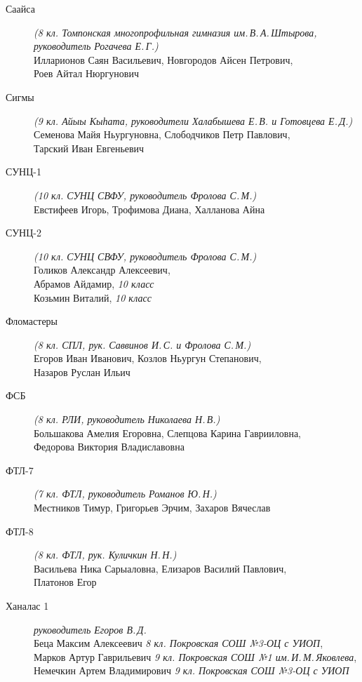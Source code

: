 \begin{description}
\item[Саайса] \textit{(8 кл. Томпонская многопрофильная гимназия им.\,В.\,А.\,Штырова, \\
руководитель Рогачева Е.\,Г.)} \\
Илларионов Саян Васильевич, Новгородов Айсен Петрович, \\
Роев Айтал Нюргунович

\item[Сигмы] \textit{(9 кл. Айыы Кыһата, руководители Халабышева Е.\,В. и Готовцева Е.\,Д.)} \\
Семенова Майя Ньургуновна, Слободчиков Петр Павлович, \\
Тарский Иван Евгеньевич

\item[СУНЦ-1] \textit{(10 кл. СУНЦ СВФУ, руководитель Фролова С.\,М.)} \\
Евстифеев Игорь, Трофимова Диана, Халланова Айна

\item[СУНЦ-2] \textit{(10 кл. СУНЦ СВФУ, руководитель Фролова С.\,М.)} \\
Голиков Александр Алексеевич, \\
Абрамов Айдамир, \textit{10 класс} \\
Козьмин Виталий, \textit{10 класс}

\item[Фломастеры] \textit{(8 кл. СПЛ, рук. Саввинов И.\,С. и Фролова С.\,М.)} \\
Егоров Иван Иванович, Козлов Ньургун Степанович, \\
Назаров Руслан Ильич

\item[ФСБ] \textit{(8 кл. РЛИ, руководитель Николаева Н.\,В.)} \\
Большакова Амелия Егоровна, Слепцова Карина Гаврииловна, \\
Федорова Виктория Владиславовна

\item[ФТЛ-7] \textit{(7 кл. ФТЛ, руководитель Романов Ю.\,Н.)} \\
Местников Тимур, Григорьев Эрчим, Захаров Вячеслав

\item[ФТЛ-8] \textit{(8 кл. ФТЛ, рук. Куличкин Н.\,Н.)} \\
Васильева Ника Сарыаловна, Елизаров Василий Павлович, \\
Платонов Егор

\item[Ханалас 1] \textit{руководитель Егоров В.\,Д.} \\
Беца Максим Алексеевич \textit{8 кл. Покровская СОШ №3-ОЦ с УИОП}, \\
Марков Артур Гаврильевич \textit{9 кл. Покровская СОШ №1 им.\,И.\,М.\,Яковлева}, \\
Немечкин Артем Владимирович \textit{9 кл. Покровская СОШ №3-ОЦ с УИОП}


\end{description}
